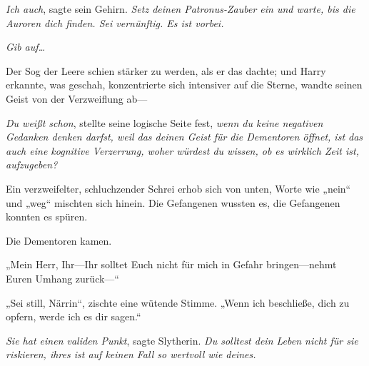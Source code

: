 \emph{Ich auch}, sagte sein Gehirn. \emph{Setz deinen Patronus-Zauber ein und warte, bis die Auroren dich finden. Sei vernünftig. Es ist vorbei.}

\emph{Gib auf…}

Der Sog der Leere schien stärker zu werden, als er das dachte; und Harry erkannte, was geschah, konzentrierte sich intensiver auf die Sterne, wandte seinen Geist von der Verzweiflung ab—

\emph{Du weißt schon}, stellte seine logische Seite fest, \emph{wenn du keine negativen Gedanken denken darfst, weil das deinen Geist für die Dementoren öffnet, ist das auch eine kognitive Verzerrung, woher würdest du wissen, ob es wirklich Zeit \emph{ist}, aufzugeben?}

Ein verzweifelter, schluchzender Schrei erhob sich von unten, Worte wie „nein“ und „weg“ mischten sich hinein. Die Gefangenen wussten es, die Gefangenen konnten es spüren.

Die Dementoren kamen.

„Mein Herr, Ihr—Ihr solltet Euch nicht für mich in Gefahr bringen—nehmt Euren Umhang zurück—“

„Sei still, Närrin“, zischte eine wütende Stimme. „Wenn ich beschließe, dich zu opfern, werde ich es dir sagen.“

\emph{Sie hat einen validen Punkt}, sagte Slytherin. \emph{Du solltest dein Leben nicht für sie riskieren, ihres ist auf keinen Fall so wertvoll wie deines.}


